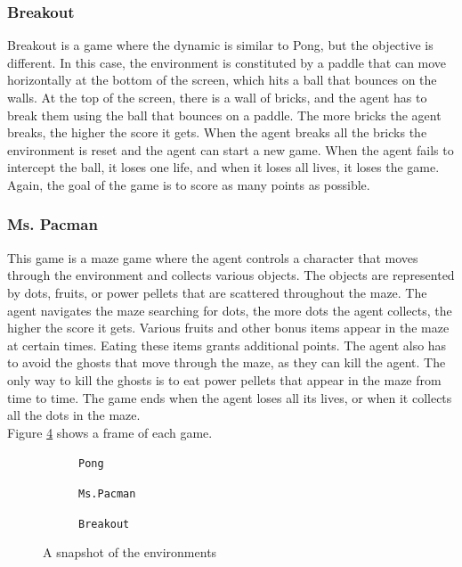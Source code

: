 \subsubsection{Breakout}
Breakout is a game where the dynamic is similar to Pong, but the objective is different.
In this case, the environment is constituted by a paddle that can move horizontally at the bottom of the screen, which hits a ball that bounces on the walls.
At the top of the screen, there is a wall of bricks, and the agent has to break them using the ball that bounces on a paddle.
The more bricks the agent breaks, the higher the score it gets.
When the agent breaks all the bricks the environment is reset and the agent can start a new game.
When the agent fails to intercept the ball, it loses one life, and when it loses all lives, it loses the game.
Again, the goal of the game is to score as many points as possible.


\subsubsection{Ms. Pacman}
This game is a maze game where the agent controls a character that moves through the environment and collects various objects.
The objects are represented by dots, fruits, or power pellets that are scattered throughout the maze.
The agent navigates the maze searching for dots, the more dots the agent collects, the higher the score it gets.
Various fruits and other bonus items appear in the maze at certain times. Eating these items grants additional points.
The agent also has to avoid the ghosts that move through the maze, as they can kill the agent.
The only way to kill the ghosts is to eat power pellets that appear in the maze from time to time.
The game ends when the agent loses all its lives, or when it collects all the dots in the maze. \\



Figure \ref{fig:environemnts} shows a frame of each game.
\begin{figure}[ht]
    \centering
    \begin{subfigure}[b]{0.30\textwidth}
        \centering
        \fbox{\rule[-.5cm]{0cm}{4cm} \rule[-.5cm]{4cm}{0cm}}
        \caption{\texttt{Pong}}
        \label{fig:pong_env}
    \end{subfigure}
    \hfill
    \begin{subfigure}[b]{0.30\textwidth}
        \centering
        \fbox{\rule[-.5cm]{0cm}{4cm} \rule[-.5cm]{4cm}{0cm}}
        \caption{\texttt{Ms.Pacman}}
        \label{fig:mspacman_env}
    \end{subfigure}
    \hfill
    \begin{subfigure}[b]{0.30\textwidth}
        \centering
        \fbox{\rule[-.5cm]{0cm}{4cm} \rule[-.5cm]{4cm}{0cm}}
        \caption{\texttt{Breakout}}
        \label{fig:breakout_env}
    \end{subfigure}
    \caption{A snapshot of the environments}
    \label{fig:environemnts}
\end{figure}